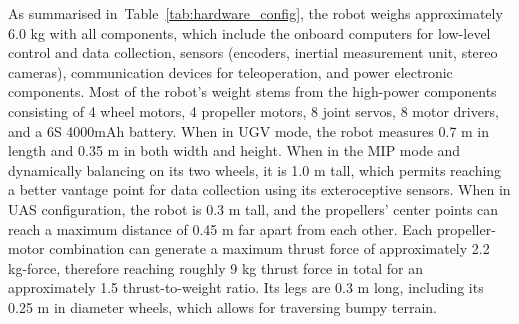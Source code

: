 \documentclass[letterpaper, 10 pt, conference]{ieeeconf}  %
\def\tabref#1{Table~\ref{#1}}
\begin{document}
As summarised in~\tabref{tab:hardware_config}, the robot weighs approximately 6.0 kg with all components, which include the onboard computers for low-level control and data collection, sensors (encoders, inertial measurement unit, stereo cameras), communication devices for teleoperation, and power electronic components. Most of the robot's weight stems from the high-power components consisting of 4 wheel motors, 4 propeller motors, 8 joint servos, 8 motor drivers, and a 6S 4000mAh battery. When in UGV mode, the robot measures 0.7 m in length and 0.35 m in both width and height. When in the MIP mode and dynamically balancing on its two wheels, it is 1.0 m tall, which permits reaching a better vantage point for data collection using its exteroceptive sensors. When in UAS configuration, the robot is 0.3 m tall, and the propellers' center points can reach a maximum distance of 0.45 m far apart from each other. Each propeller-motor combination can generate a maximum thrust force of approximately 2.2 kg-force, therefore reaching roughly 9 kg thrust force in total for an approximately 1.5 thrust-to-weight ratio. Its legs are 0.3 m long, including its 0.25 m in diameter wheels, which allows for traversing bumpy terrain.



\end{document}
